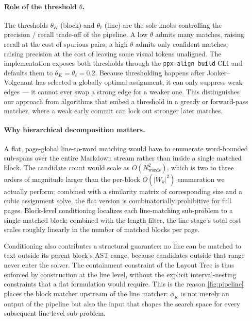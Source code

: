 \documentclass{article}
\theoremstyle{definition}
\begin{document}
\paragraph{Role of the threshold $\theta$.}
The thresholds $\theta_K$ (block) and $\theta_\ell$ (line) are the
sole knobs controlling the precision / recall trade-off of the
pipeline.  A low $\theta$ admits many matches, raising recall at the
cost of spurious pairs; a high $\theta$ admits only confident
matches, raising precision at the cost of leaving some visual tokens
unaligned.  The implementation exposes both thresholds through the
\texttt{ppx-align build} CLI and defaults them to
$\theta_K = \theta_\ell = 0.2$.  Because thresholding happens after
Jonker--Volgenant has selected a globally optimal assignment, it can
only suppress weak edges --- it cannot ever swap a strong edge for a
weaker one.  This distinguishes our approach from algorithms that
embed a threshold in a greedy or forward-pass matcher, where a weak
early commit can lock out stronger later matches.

\paragraph{Why hierarchical decomposition matters.}
A flat, page-global line-to-word matching would have to enumerate
word-bounded sub-spans over the entire Markdown stream rather than
inside a single matched block.  The candidate count would scale as
$O(N_{\text{words}}^2)$, which is two to three orders of magnitude
larger than the per-block $O(|W_k|^2)$ enumeration we actually
perform; combined with a similarity matrix of corresponding size and
a cubic assignment solve, the flat version is combinatorially
prohibitive for full pages.  Block-level conditioning localizes each
line-matching sub-problem to a single matched block; combined with
the length filter, the line stage's total cost scales roughly
linearly in the number of matched blocks per page.

Conditioning also contributes a structural guarantee: no line can be
matched to text outside its parent block's AST range, because
candidates outside that range never enter the solver.  The
containment constraint of the Layout Tree is thus enforced by
construction at the line level, without the explicit interval-nesting
constraints that a flat formulation would require.  This is the
reason \cref{fig:pipeline} places the block matcher upstream of the
line matcher: $\phi_K$ is not merely an output of the pipeline but
also the input that shapes the search space for every subsequent
line-level sub-problem.
\end{document}

